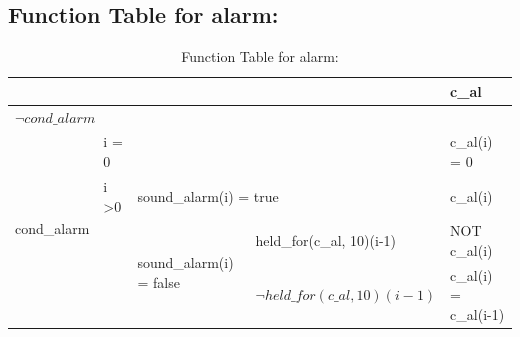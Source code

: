 \documentclass[fontsize=12pt,paper=letter,twoside]{scrartcl}
\begin{document}
\subsection{Function Table for alarm: }
\begin{table}[htb!]
\centering
\label{my-label}
\begin{tabular}{llll|l|}
\cline{5-5}                                       &                                       &                                                               &                               & c\_al                 \\ \hline
\multicolumn{5}{|l|}{$\neg cond\_alarm$ \footnotemark                                                                                                                                                                             } \\ \hline
\multicolumn{1}{|l|}{\multirow{4}{*}{cond\_alarm}} & \multicolumn{1}{l|}{i = 0}            & \multicolumn{1}{l|}{}                                         &                               & c\_al(i) = 0          \\ \cline{2-5}
\multicolumn{1}{|l|}{}                             & \multicolumn{1}{l|}{i \textgreater 0} & \multicolumn{2}{l|}{sound\_alarm(i) = true}                                                   & c\_al(i)              \\ \cline{2-5}
\multicolumn{1}{|l|}{}                             & \multicolumn{1}{l|}{}                 & \multicolumn{1}{l|}{\multirow{2}{*}{sound\_alarm(i) = false}} & held\_for(c\_al, 10)(i-1)     & NOT c\_al(i)          \\ \cline{2-2} \cline{4-5}
\multicolumn{1}{|l|}{}                             & \multicolumn{1}{l|}{}                 & \multicolumn{1}{l|}{}                                         & $\neg held\_for(c\_al, 10)(i-1)$ & c\_al(i) = c\_al(i-1) \\ \hline
\end{tabular}
\caption{Function Table for alarm: }
\end{table}
\end{document}
